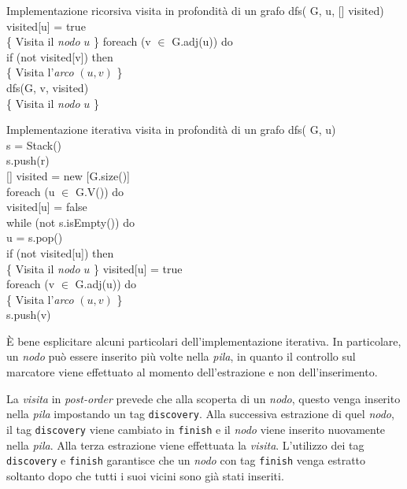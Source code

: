 \begin{minicode}{Implementazione ricorsiva visita in profondità di un grafo}
\ind dfs( G,  u, [] visited)\\
    visited[u] = true\\
    \{ Visita il \emph{nodo} $u$ \}\hfill{}
    \indf foreach (v $\in$ G.adj(u)) do\\
        \indff if (not visited[v]) then\\
            \{ Visita l'\emph{arco} $(u,v)$ \}\\
            dfs(G, v, visited)\\

    \indf\{ Visita il \emph{nodo} $u$ \}\hfill{}
\end{minicode}
\begin{minicode}{Implementazione iterativa visita in profondità di un grafo}
\ind dfs( G,  u)\\
     s = Stack()\\
    s.push(r)\\
    [] visited = new [G.size()]\\
    \indf foreach (u $\in$ G.V()) do\\
        visited[u] = false\\
    \indf while (not s.isEmpty()) do\\
         u = s.pop()\\
        \indff if (not visited[u]) then\\
            \{ Visita il \emph{nodo} $u$ \}\hfill{}
            visited[u] = true\\
            \indfff foreach (v $\in$ G.adj(u)) do\\
                \{ Visita l'\emph{arco} $(u,v)$ \}\\
                s.push(v)
\end{minicode}\noindent
È bene esplicitare alcuni particolari dell'implementazione iterativa. In
particolare, un \emph{nodo} può essere inserito più volte nella \emph{pila},
in quanto il controllo sul marcatore viene effettuato al momento dell'estrazione
e non dell'inserimento.

La \emph{visita} in \emph{post-order} prevede che alla scoperta di un \emph{nodo}, questo venga inserito nella
\emph{pila} impostando un tag \texttt{discovery}. Alla successiva estrazione di
quel \emph{nodo}, il tag \texttt{discovery} viene cambiato in \texttt{finish} e
il \emph{nodo} viene inserito nuovamente nella \emph{pila}. Alla terza
estrazione viene effettuata la \emph{visita}. L'utilizzo dei tag \texttt{discovery}
e \texttt{finish} garantisce che un \emph{nodo} con tag \texttt{finish} venga
estratto soltanto dopo che tutti i suoi vicini sono già stati inseriti.

